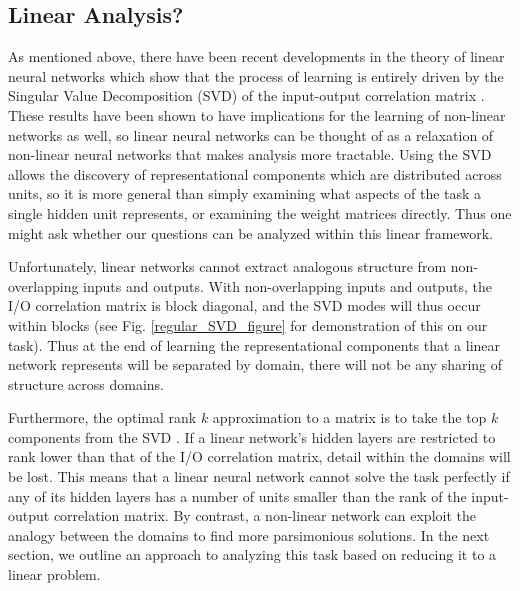 \documentclass[10pt,letterpaper]{article}
\begin{document}
\subsection{Linear Analysis?}
As mentioned above, there have been recent developments in the theory of linear neural networks which show that the process of learning is entirely driven by the Singular Value Decomposition (SVD) of the input-output correlation matrix \citep{Saxe2013}. These results have been shown to have implications for the learning of non-linear networks as well, so linear neural networks can be thought of as a relaxation of non-linear neural networks that makes analysis more tractable. Using the SVD allows the discovery of representational components which are distributed across units, so it is more general than simply examining what aspects of the task a single hidden unit represents, or examining the weight matrices directly. Thus one might ask whether our questions can be analyzed within this linear framework. \par
Unfortunately, linear networks cannot extract analogous structure from non-overlapping inputs and outputs. With non-overlapping inputs and outputs, the I/O correlation matrix is block diagonal, and the SVD modes will thus occur within blocks (see Fig. \ref{regular_SVD_figure} for demonstration of this on our task). Thus at the end of learning the representational components that a linear network represents will be separated by domain, there will not be any sharing of structure across domains.\par 
Furthermore, the optimal rank $k$ approximation to a matrix is to take the top $k$ components from the SVD \citep{Mirsky1960}. If a linear network's hidden layers are restricted to rank lower than that of the I/O correlation matrix, detail within the domains will be lost. This means that a linear neural network cannot solve the task perfectly if any of its hidden layers has a number of units smaller than the rank of the input-output correlation matrix. By contrast, a non-linear network can exploit the analogy between the domains to find more parsimonious solutions. In the next section, we outline an approach to analyzing this task based on reducing it to a linear problem.
\end{document}
